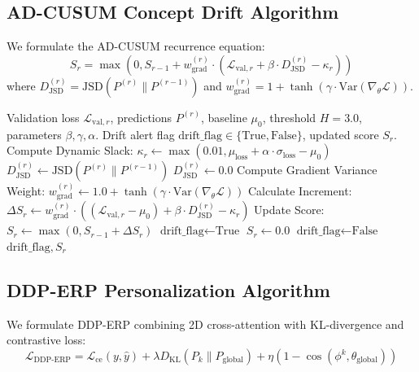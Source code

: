 \documentclass[11pt,a4paper]{article}
\begin{document}
\subsection{AD-CUSUM Concept Drift Algorithm}
We formulate the AD-CUSUM recurrence equation:
$$S_r = \max\left(0, S_{r-1} + w_{\text{grad}}^{(r)} \cdot \left(\mathcal{L}_{\text{val}, r} + \beta \cdot D_{\text{JSD}}^{(r)} - \kappa_r\right)\right)$$
where $D_{\text{JSD}}^{(r)} = \text{JSD}\left(P^{(r)} \parallel P^{(r-1)}\right)$ and $w_{\text{grad}}^{(r)} = 1 + \tanh(\gamma \cdot \text{Var}(\nabla_\theta \mathcal{L}))$.

\begin{algorithm}[htbp]
\caption{Proposed AD-CUSUM Drift Detection Algorithm (Project Invention)}
\label{alg:ad_cusum_springer}
\begin{algorithmic}[1]
\REQUIRE Validation loss $\mathcal{L}_{\text{val}, r}$, predictions $P^{(r)}$, baseline $\mu_0$, threshold $H = 3.0$, parameters $\beta, \gamma, \alpha$.
\ENSURE Drift alert flag $\text{drift\_flag} \in \{\text{True}, \text{False}\}$, updated score $S_r$.
\STATE Compute Dynamic Slack: $\kappa_r \leftarrow \max(0.01, \mu_{\text{loss}} + \alpha \cdot \sigma_{\text{loss}} - \mu_0)$
    \STATE $D_{\text{JSD}}^{(r)} \leftarrow \text{JSD}\left(P^{(r)} \parallel P^{(r-1)}\right)$
\ELSE
    \STATE $D_{\text{JSD}}^{(r)} \leftarrow 0.0$
\ENDIF
\STATE Compute Gradient Variance Weight: $w_{\text{grad}}^{(r)} \leftarrow 1.0 + \tanh\left(\gamma \cdot \text{Var}(\nabla_\theta \mathcal{L})\right)$
\STATE Calculate Increment: $\Delta S_r \leftarrow w_{\text{grad}}^{(r)} \cdot \left((\mathcal{L}_{\text{val}, r} - \mu_0) + \beta \cdot D_{\text{JSD}}^{(r)} - \kappa_r\right)$
\STATE Update Score: $S_r \leftarrow \max(0, S_{r-1} + \Delta S_r)$
    \STATE $\text{drift\_flag} \leftarrow \text{True}$ 
    \STATE $S_r \leftarrow 0.0$ 
\ELSE
    \STATE $\text{drift\_flag} \leftarrow \text{False}$
\ENDIF
\RETURN $\text{drift\_flag}, S_r$
\end{algorithmic}
\end{algorithm}

\subsection{DDP-ERP Personalization Algorithm}
We formulate DDP-ERP combining 2D cross-attention with KL-divergence and contrastive loss:
$$\mathcal{L}_{\text{DDP-ERP}} = \mathcal{L}_{\text{ce}}(y, \hat{y}) + \lambda D_{\text{KL}}\left(P_k \parallel P_{\text{global}}\right) + \eta (1 - \cos(\phi^k, \theta_{\text{global}}))$$
\end{document}
